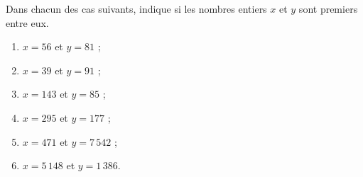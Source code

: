 
Dans chacun des cas suivants, indique si les nombres entiers $x$ et $y$ sont premiers entre eux.
\begin{multicols}{3}
\begin{enumerate}
\item $x=56$ et $y=81$ ;
\item $x=39$ et $y=91$ ;
\item $x=143$ et $y=85$ ;
\item $x=295$ et $y=177$ ;
\item $x=471$ et $y=7\,542$ ;
\item $x=5\,148$ et $y=1\,386$.
\end{enumerate}
\end{multicols}

